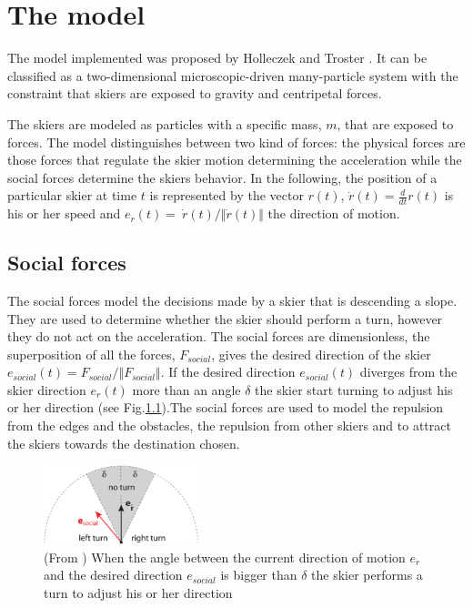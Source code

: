 \documentclass[12pt,a4paper,twoside]{book}
\begin{document}
\chapter{The model}\label{model}
The model implemented was proposed by Holleczek and Troster \cite{hol2012}. It can be classified as a two-dimensional microscopic-driven many-particle system with the constraint that skiers are exposed to gravity and centripetal forces.

The skiers are modeled as particles with a specific mass, $m$, that are exposed to forces. The model distinguishes between two kind of forces: the physical forces are those forces that regulate the skier motion determining the acceleration while the social forces determine the skiers behavior. In the following, the position of a particular skier at time $t$ is represented by the vector $r(t)$, $\dot{r}(t)=\frac{d}{dt}r(t)$ is his or her speed and $e_{\dot{r}}(t)=\ \dot{r}(t) / \Vert \dot{r}(t)\Vert$ the direction of motion.

\section{Social forces}
The social forces model the decisions made by a skier that is descending a slope. They are used to determine whether the skier should perform a turn, however they do not act on the acceleration. The social forces are dimensionless, the superposition of all the forces, $F_{social}$, gives the desired direction of the skier $e_{social}(t)=F_{social} / \Vert F_{social} \Vert$. If the desired direction $e_{social}(t)$ diverges from the skier direction $e_{\dot{r}}(t)$ more than an angle ${\delta}$ the skier start turning to adjust his or her direction (see Fig.\ref{start_turn_pic}).The social forces are used to model the repulsion from the edges and the obstacles, the repulsion from other skiers and to attract the skiers towards the destination chosen.

\begin{figure}[!ht]
  \begin{center}
    \includegraphics[width=0.4\textwidth]{images/start_turn_pic.eps}
    \caption{(From \cite{hol2012}) When the angle between the current direction of motion $e_{\dot{r}}$ and the desired direction $e_{social}$ is bigger than $\delta$ the skier performs a turn to adjust his or her direction}\label{start_turn_pic}
  \end{center}
\end{figure}
\end{document}
